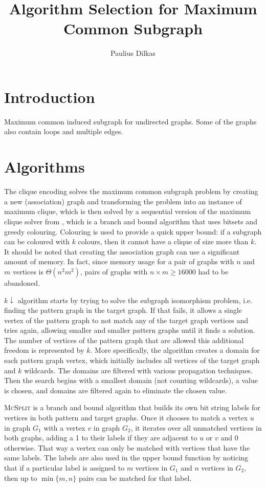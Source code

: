 \documentclass{article}
\author{Paulius Dilkas}
\title{Algorithm Selection for Maximum Common Subgraph}
\theoremstyle{definition}
\begin{document}
\maketitle

\section{Introduction}
Maximum common induced subgraph for undirected graphs. Some of the graphs also
contain loops and multiple edges.

\section{Algorithms}
The clique encoding \cite{DBLP:conf/cp/McCreeshNPS16} solves the maximum common
subgraph problem by creating a new (association) graph and transforming the
problem into an instance of maximum clique, which is then solved by a sequential
version of the maximum clique solver from \cite{DBLP:journals/topc/McCreeshP15},
which is a branch and bound algorithm that uses bitsets and greedy colouring.
Colouring is used to provide a quick upper bound: if a subgraph can be coloured
with $k$ colours, then it cannot have a clique of size more than $k$. It should
be noted that creating the association graph can use a significant amount of
memory. In fact, since memory usage for a pair of graphs with $n$ and $m$
vertices is $\Theta(n^2m^2)$, pairs of graphs with $n \times m \ge 16000 $ had
to be abandoned. %

$k\downarrow$ algorithm \cite{DBLP:conf/aaai/HoffmannMR17} starts by trying to
solve the subgraph isomorphism problem, i.e. finding the pattern graph in the
target graph. If that fails, it allows a single vertex of the pattern graph to
not match any of the target graph vertices and tries again, allowing smaller and
smaller pattern graphs until it finds a solution. The number of vertices of the
pattern graph that are allowed this additional freedom is represented by $k$.
More specifically, the algorithm creates a domain for each pattern graph vertex,
which initially includes all vertices of the target graph and $k$ wildcards. The
domains are filtered with various propagation techniques. Then the search begins
with a smallest domain (not counting wildcards), a value is chosen, and domains
are filtered again to eliminate the chosen value.

\textsc{McSplit} \cite{DBLP:conf/ijcai/McCreeshPT17} is a branch and bound
algorithm that builds its own bit string labels for vertices in both pattern and
target graphs. Once it chooses to match a vertex $u$ in graph $G_1$ with a
vertex $v$ in graph $G_2$, it iterates over all unmatched vertices in both
graphs, adding a 1 to their labels if they are adjacent to $u$ or $v$ and 0
otherwise. That way a vertex can only be matched with vertices that have the
same labels. The labels are also used in the upper bound function by noticing
that if a particular label is assigned to $m$ vertices in $G_1$ and $n$
vertices in $G_2$, then up to $\min \{ m, n \}$ pairs can be matched for that
label.
\end{document}
